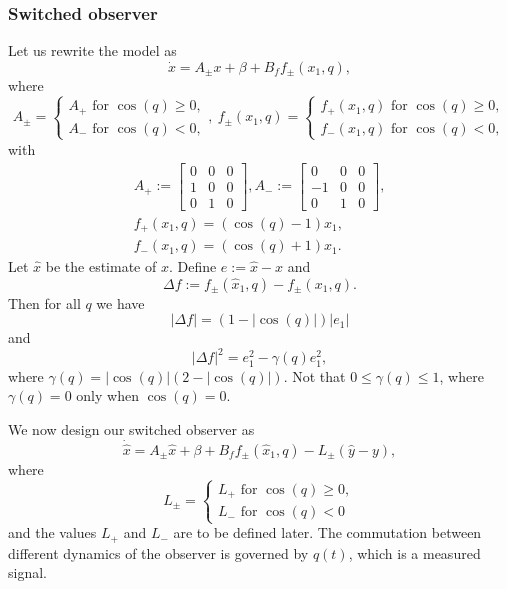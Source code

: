 \subsubsection*{Switched observer}
Let us rewrite the model as
\[
	\dot{x} = A_\pm x + \beta +B_f f_\pm(x_1,q),
\]
where
\[
	A_{\pm} = \begin{cases}
		A_+ \text{ for } \cos(q)\ge0, \\
		A_- \text{ for } \cos(q)<0,
	\end{cases},
	\ 
	f_{\pm}(x_1,q) = \begin{cases}
		f_+(x_1,q) \text{ for } \cos(q)\ge0, \\
		f_-(x_1,q) \text{ for } \cos(q)<0,
	\end{cases}	
\]
with
\[
	\begin{gathered}
		A_+:=\begin{bmatrix} 0 & 0 & 0 \\ 1 & 0 & 0 \\ 0 & 1 & 0 \end{bmatrix}, A_-:=\begin{bmatrix} 0 & 0 & 0 \\ -1 & 0 & 0 \\ 0 & 1 & 0 \end{bmatrix}, \\
		f_+(x_1,q) = \left(\cos(q)-1\right)x_1, \\ 
		f_-(x_1,q) = \left(\cos(q)+1\right)x_1.
	\end{gathered}
\]
Let $\hat{x}$ be the estimate of $x$. Define $e:=\hat{x}-x$ and
\[
	\Delta f:= f_\pm(\hat{x}_1,q)-f_\pm(x_1,q).
\]
Then for all $q$ we have 
\[
	|\Delta f| = \left(1-|\cos(q)|\right)|e_1|
\]
and 
\[
	|\Delta f|^2 = e_1^2 - \gamma(q)e_1^2, 
\]
where $\gamma(q)=|\cos(q)|\left(2 - |\cos(q)|\right)$. Not that $0\le \gamma(q) \le 1$, where $\gamma(q)=0$ only when $\cos(q)=0$.

We now design our switched observer as
\[
	\dot{\hat{x}} = A_\pm \hat{x} + \beta + B_f f_\pm(\hat{x}_1,q) - L_\pm(\hat{y}-y),
\]
where 
\[
	L_{\pm} = \begin{cases}
		L_+ \text{ for } \cos(q)\ge0, \\
		L_- \text{ for } \cos(q)<0
	\end{cases}
\]
and the values $L_+$ and $L_-$ are to be defined later. The commutation between different dynamics of the observer is governed by $q(t)$, which is a measured signal.

\bigskip

